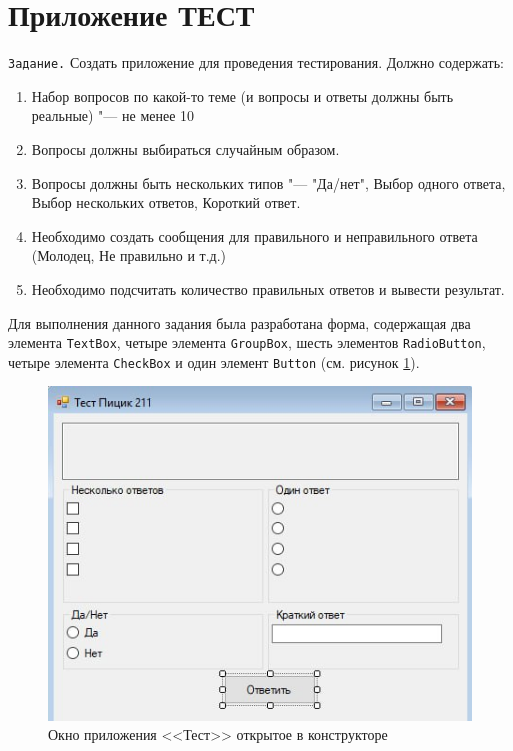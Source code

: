 \section{Приложение ТЕСТ}
\verb|Задание.| Создать приложение для проведения тестирования. \newline Должно содержать:
\begin{enumerate}
    \item Набор вопросов по какой-то теме (и вопросы и ответы должны быть реальные) "--- не менее 10
    \item Вопросы должны выбираться случайным образом.
    \item Вопросы должны быть нескольких типов "--- "Да/нет", Выбор одного ответа, Выбор нескольких ответов, Короткий ответ.
    \item Необходимо создать сообщения для правильного и неправильного ответа (Молодец, Не правильно и т.д.)
    \item Необходимо подсчитать количество правильных ответов и вывести результат.
\end{enumerate}

Для выполнения данного задания была разработана форма, содержащая два элемента 
\verb|TextBox|, четыре элемента \verb|GroupBox|, шесть элементов \verb|RadioButton|, 
четыре элемента \verb|CheckBox| и один элемент \verb|Button| (см. рисунок \ref{fig:test_const}).
\begin{figure}[H]
\centering
\includegraphics[scale=.85]{../img/test/test_const.jpg}
\caption{Окно приложения <<Тест>> открытое в конструкторе}
\label{fig:test_const}
\end{figure}

